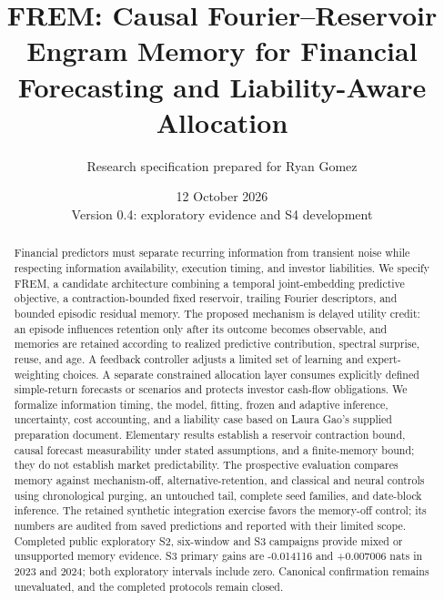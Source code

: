 \documentclass[11pt,a4paper]{article}
\title{FREM: Causal Fourier--Reservoir Engram Memory for Financial Forecasting and Liability-Aware Allocation}
\author{Research specification prepared for Ryan Gomez}
\date{12 October 2026\\Version 0.4: exploratory evidence and S4 development}
\begin{document}
\maketitle
\begin{center}
\end{center}

\begin{abstract}
Financial predictors must separate recurring information from transient noise while respecting information availability, execution timing, and investor liabilities. We specify FREM, a candidate architecture combining a temporal joint-embedding predictive objective, a contraction-bounded fixed reservoir, trailing Fourier descriptors, and bounded episodic residual memory. The proposed mechanism is delayed utility credit: an episode influences retention only after its outcome becomes observable, and memories are retained according to realized predictive contribution, spectral surprise, reuse, and age. A feedback controller adjusts a limited set of learning and expert-weighting choices. A separate constrained allocation layer consumes explicitly defined simple-return forecasts or scenarios and protects investor cash-flow obligations. We formalize information timing, the model, fitting, frozen and adaptive inference, uncertainty, cost accounting, and a liability case based on Laura Gao's supplied preparation document. Elementary results establish a reservoir contraction bound, causal forecast measurability under stated assumptions, and a finite-memory bound; they do not establish market predictability. The prospective evaluation compares memory against mechanism-off, alternative-retention, and classical and neural controls using chronological purging, an untouched tail, complete seed families, and date-block inference. The retained synthetic integration exercise favors the memory-off control; its numbers are audited from saved predictions and reported with their limited scope. Completed public exploratory S2, six-window and S3 campaigns provide mixed or unsupported memory evidence. S3 primary gains are -0.014116 and +0.007006 nats in 2023 and 2024; both exploratory intervals include zero. Canonical confirmation remains unevaluated, and the completed protocols remain closed.
\end{abstract}
\newpage
\begingroup
\small
\setlength{\parskip}{0pt}
\tableofcontents
\endgroup
\newpage
\end{document}
